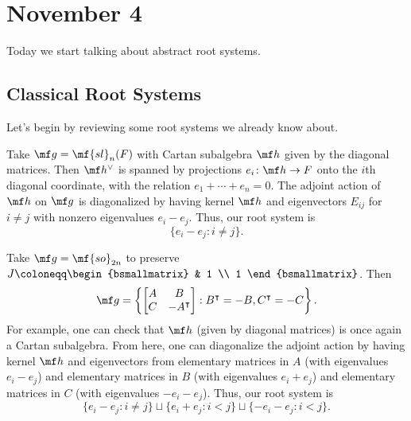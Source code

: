 \documentclass[../notes.tex]{subfiles}
\begin{document}
\section{November 4}
Today we start talking about abstract root systems.

\subsection{Classical Root Systems}
Let's begin by reviewing some root systems we already know about.
\begin{example}[type $A_{n-1}$]
	Take $\mf g=\mf{sl}_n(F)$ with Cartan subalgebra $\mf h$ given by the diagonal matrices. Then $\mf h^\lor$ is spanned by projections $e_i\colon\mf h\to F$ onto the $i$th diagonal coordinate, with the relation $e_1+\cdots+e_n=0$. The adjoint action of $\mf h$ on $\mf g$ is diagonalized by having kernel $\mf h$ and eigenvectors $E_{ij}$ for $i\ne j$ with nonzero eigenvalues $e_i-e_j$. Thus, our root system is
	\[\{e_i-e_j:i\ne j\}.\]
\end{example}
\begin{example}[type $D_n$]
	Take $\mf g=\mf{so}_{2n}$ to preserve $J\coloneqq\begin{bsmallmatrix}
		& 1 \\ 1
	\end{bsmallmatrix}$. Then
	\[\mf g=\left\{\begin{bmatrix}
		A & B \\ C & -A^\intercal
	\end{bmatrix}:B^\intercal=-B,C^\intercal=-C\right\}.\]
	For example, one can check that $\mf h$ (given by diagonal matrices) is once again a Cartan subalgebra. From here, one can diagonalize the adjoint action by having kernel $\mf h$ and eigenvectors from elementary matrices in $A$ (with eigenvalues $e_i-e_j$) and elementary matrices in $B$ (with eigenvalues $e_i+e_j$) and elementary matrices in $C$ (with eigenvalues $-e_i-e_j$). Thus, our root system is
	\[\{e_i-e_j:i\ne j\}\sqcup\{e_i+e_j:i<j\}\sqcup\{-e_i-e_j:i<j\}.\]
\end{example}
\end{document}
